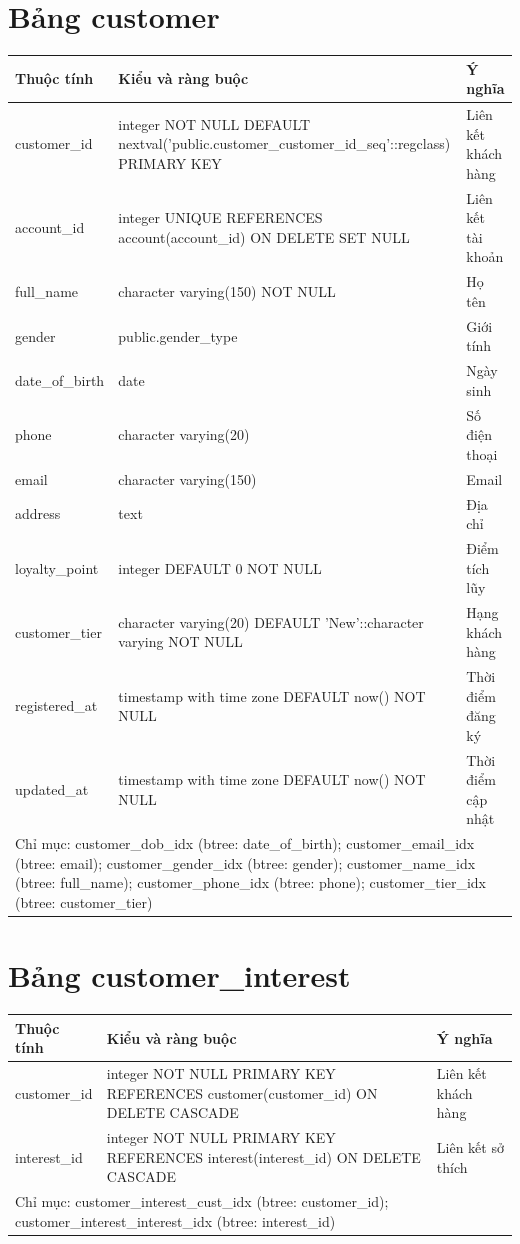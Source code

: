\section{Bảng customer}
\begin{longtable}{|p{}|p{}|p{}|}\hline
\textbf{Thuộc tính}&\textbf{Kiểu và ràng buộc}&\textbf{Ý nghĩa}\\\hline\endhead
customer\_id & integer NOT NULL DEFAULT nextval('public.customer\_customer\_id\_seq'::regclass) PRIMARY KEY & Liên kết khách hàng\\\hline
account\_id & integer UNIQUE REFERENCES account(account\_id) ON DELETE SET NULL & Liên kết tài khoản\\\hline
full\_name & character varying(150) NOT NULL & Họ tên\\\hline
gender & public.gender\_type & Giới tính\\\hline
date\_of\_birth & date & Ngày sinh\\\hline
phone & character varying(20) & Số điện thoại\\\hline
email & character varying(150) & Email\\\hline
address & text & Địa chỉ\\\hline
loyalty\_point & integer DEFAULT 0 NOT NULL & Điểm tích lũy\\\hline
customer\_tier & character varying(20) DEFAULT 'New'::character varying NOT NULL & Hạng khách hàng\\\hline
registered\_at & timestamp with time zone DEFAULT now() NOT NULL & Thời điểm đăng ký\\\hline
updated\_at & timestamp with time zone DEFAULT now() NOT NULL & Thời điểm cập nhật\\\hline
\multicolumn{3}{|p{0.93\textwidth}|}{Chỉ mục: customer\_dob\_idx (btree: date\_of\_birth); customer\_email\_idx (btree: email); customer\_gender\_idx (btree: gender); customer\_name\_idx (btree: full\_name); customer\_phone\_idx (btree: phone); customer\_tier\_idx (btree: customer\_tier)}\\\hline
\end{longtable}
\normalsize
\section{Bảng customer\_interest}
\begin{longtable}{|p{}|p{}|p{}|}\hline
\textbf{Thuộc tính}&\textbf{Kiểu và ràng buộc}&\textbf{Ý nghĩa}\\\hline\endhead
customer\_id & integer NOT NULL PRIMARY KEY REFERENCES customer(customer\_id) ON DELETE CASCADE & Liên kết khách hàng\\\hline
interest\_id & integer NOT NULL PRIMARY KEY REFERENCES interest(interest\_id) ON DELETE CASCADE & Liên kết sở thích\\\hline
\multicolumn{3}{|p{0.93\textwidth}|}{Chỉ mục: customer\_interest\_cust\_idx (btree: customer\_id); customer\_interest\_interest\_idx (btree: interest\_id)}\\\hline
\end{longtable}
\normalsize
